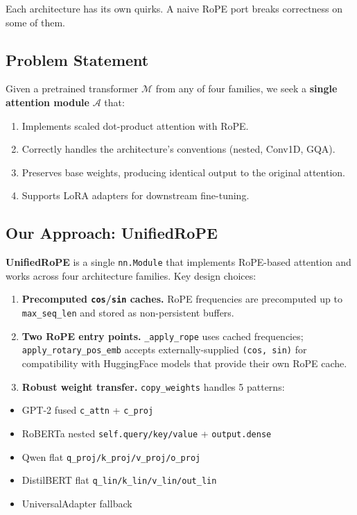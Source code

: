 {\begin{itemize}
\end{itemize}
Each architecture has its own quirks. A naive RoPE port breaks correctness 
on some of them.

\subsection{Problem Statement}

Given a pretrained transformer $\mathcal{M}$ from any of four families, we 
seek a \textbf{single attention module} $\mathcal{A}$ that:

\begin{enumerate}
\item Implements scaled dot-product attention with RoPE.
\item Correctly handles the architecture's conventions (nested, Conv1D, GQA).
\item Preserves base weights, producing identical output to the original
  attention.
\item Supports LoRA adapters for downstream fine-tuning.

\end{enumerate}
\subsection{Our Approach: UnifiedRoPE}

\textbf{UnifiedRoPE} is a single \texttt{nn.Module} that implements RoPE-based 
attention and works across four architecture families. Key design choices:

\begin{enumerate}
\item \textbf{Precomputed \texttt{cos}/\texttt{sin} caches.} RoPE frequencies are precomputed up
  to \texttt{max\_seq\_len} and stored as non-persistent buffers.

\item \textbf{Two RoPE entry points.} \texttt{\_apply\_rope} uses cached frequencies;
  \texttt{apply\_rotary\_pos\_emb} accepts externally-supplied \texttt{(cos, sin)} for
  compatibility with HuggingFace models that provide their own RoPE cache.

\item \textbf{Robust weight transfer.} \texttt{copy\_weights} handles 5 patterns:
\end{enumerate}
\begin{itemize}
\item GPT-2 fused \texttt{c\_attn} + \texttt{c\_proj}
\item RoBERTa nested \texttt{self.query/key/value} + \texttt{output.dense}
\item Qwen flat \texttt{q\_proj/k\_proj/v\_proj/o\_proj}
\item DistilBERT flat \texttt{q\_lin/k\_lin/v\_lin/out\_lin}
\item UniversalAdapter fallback


\end{itemize}}
